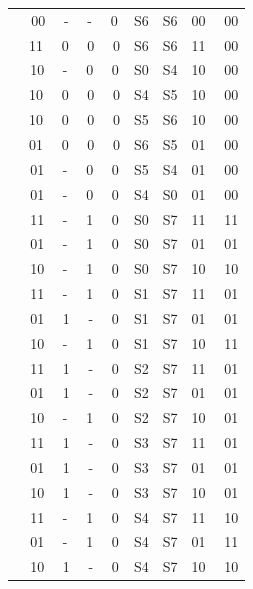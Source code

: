 \documentclass[a4paper]{report}
\begin{document}
\begin{center}
\begin{table}[h]
\begin{tabular}{|c|c|c|c|}
      \cline{1-4} \ \ 
      00 \ \ - \ \ - \ \ 0 & S6 & S6 & 00 \ \ 00 \\
      \cline{1-4} \ \ 
      11 \ \ 0 \ \ 0 \ \ 0 & S6 & S6 & 11 \ \ 00 \\
      \cline{1-4} \ \ 
      10 \ \ - \ \ 0 \ \ 0 & S0 & S4 & 10 \ \ 00 \\
      \cline{1-4} \ \ 
      10 \ \ 0 \ \ 0 \ \ 0 & S4 & S5 & 10 \ \ 00 \\
      \cline{1-4} \ \ 
      10 \ \ 0 \ \ 0 \ \ 0 & S5 & S6 & 10 \ \ 00 \\
      \cline{1-4} \ \ 
      01 \ \ 0 \ \ 0 \ \ 0 & S6 & S5 & 01 \ \ 00 \\
      \cline{1-4} \ \ 
      01 \ \ - \ \ 0 \ \ 0 & S5 & S4 & 01 \ \ 00 \\
      \cline{1-4} \ \ 
      01 \ \ - \ \ 0 \ \ 0 & S4 & S0 & 01 \ \ 00 \\
      \cline{1-4} \ \ 
      11 \ \ - \ \ 1 \ \ 0 & S0 & S7 & 11 \ \ 11 \\
      \cline{1-4} \ \ 
      01 \ \ - \ \ 1 \ \ 0 & S0 & S7 & 01 \ \ 01 \\
      \cline{1-4} \ \ 
      10 \ \ - \ \ 1 \ \ 0 & S0 & S7 & 10 \ \ 10 \\
      \cline{1-4} \ \ 
      11 \ \ - \ \ 1 \ \ 0 & S1 & S7 & 11 \ \ 01 \\
      \cline{1-4} \ \ 
      01 \ \ 1 \ \ - \ \ 0 & S1 & S7 & 01 \ \ 01 \\
      \cline{1-4} \ \ 
      10 \ \ - \ \ 1 \ \ 0 & S1 & S7 & 10 \ \ 11 \\
      \cline{1-4} \ \ 
      11 \ \ 1 \ \ - \ \ 0 & S2 & S7 & 11 \ \ 01 \\
      \cline{1-4} \ \ 
      01 \ \ 1 \ \ - \ \ 0 & S2 & S7 & 01 \ \ 01 \\
      \cline{1-4} \ \ 
      10 \ \ - \ \ 1 \ \ 0 & S2 & S7 & 10 \ \ 01 \\
      \cline{1-4} \ \ 
      11 \ \ 1 \ \ - \ \ 0 & S3 & S7 & 11 \ \ 01 \\
      \cline{1-4} \ \ 
      01 \ \ 1 \ \ - \ \ 0 & S3 & S7 & 01 \ \ 01 \\
      \cline{1-4} \ \ 
      10 \ \ 1 \ \ - \ \ 0 & S3 & S7 & 10 \ \ 01 \\
      \cline{1-4} \ \ 
      11 \ \ - \ \ 1 \ \ 0 & S4 & S7 & 11 \ \ 10 \\
      \cline{1-4} \ \ 
      01 \ \ - \ \ 1 \ \ 0 & S4 & S7 & 01 \ \ 11 \\
      \cline{1-4} \ \ 
      10 \ \ 1 \ \ - \ \ 0 & S4 & S7 & 10 \ \ 10 \\

\end{tabular}
\end{table}
\end{center}
\end{document}
